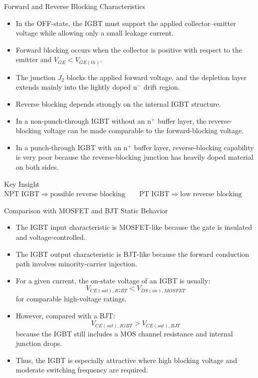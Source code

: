 \begin{frame}{Forward and Reverse Blocking Characteristics}
\begin{itemize}
    \item In the OFF-state, the IGBT must support the applied collector--emitter voltage while allowing only a small leakage current.
    \item Forward blocking occurs when the collector is positive with respect to the emitter and $V_{GE}<V_{GE(th)}$.
    \item The junction $J_2$ blocks the applied forward voltage, and the depletion layer extends mainly into the lightly doped n$^-$ drift region.
    \item Reverse blocking depends strongly on the internal IGBT structure.
    \item In a non-punch-through IGBT without an n$^+$ buffer layer, the reverse-blocking voltage can be made comparable to the forward-blocking voltage.
    \item In a punch-through IGBT with an n$^+$ buffer layer, reverse-blocking capability is very poor because the reverse-blocking junction has heavily doped material on both sides.
\end{itemize}

\begin{block}{Key Insight}
$\text{NPT IGBT} \Rightarrow \text{possible reverse blocking}
\qquad
\text{PT IGBT} \Rightarrow \text{low reverse blocking}$
\end{block}
\end{frame}


\begin{frame}{Comparison with MOSFET and BJT Static Behavior}

\begin{itemize}
    \item The IGBT input characteristic is MOSFET-like because the gate is insulated and voltage-controlled.
    \item The IGBT output characteristic is BJT-like because the forward conduction path involves minority-carrier injection.
    \item For a given current, the on-state voltage of an IGBT is usually:
    \[
        V_{CE(sat),IGBT} < V_{DS(on),MOSFET}
    \]
    for comparable high-voltage ratings.
    \item However, compared with a BJT:
    \[
        V_{CE(sat),IGBT} > V_{CE(sat),BJT}
    \]
    because the IGBT still includes a MOS channel resistance and internal junction drops.
    \item Thus, the IGBT is especially attractive where high blocking voltage and moderate switching frequency are required.
\end{itemize}

\end{frame}


